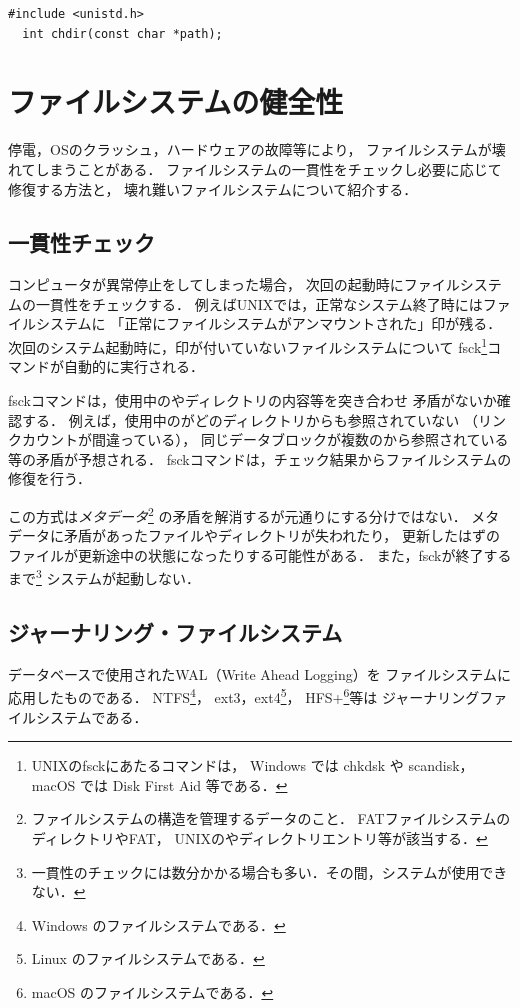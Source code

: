 \begin{lstlisting}[numbers=none]
  #include <unistd.h>
  int chdir(const char *path);
\end{lstlisting}

\section{ファイルシステムの健全性}
停電，OSのクラッシュ，ハードウェアの故障等により，
ファイルシステムが壊れてしまうことがある．
ファイルシステムの一貫性をチェックし必要に応じて修復する方法と，
壊れ難いファイルシステムについて紹介する．

\subsection{一貫性チェック}
\label{unmountFlag}
コンピュータが異常停止をしてしまった場合，
次回の起動時にファイルシステムの一貫性をチェックする．
例えばUNIXでは，正常なシステム終了時にはファイルシステムに
「正常にファイルシステムがアンマウントされた」印が残る．
次回のシステム起動時に，印が付いていないファイルシステムについて
fsck\footnote{
  UNIXのfsckにあたるコマンドは，
  Windows では chkdsk や scandisk，macOS では Disk First Aid 等である．
}コマンドが自動的に実行される．

fsckコマンドは，使用中の\inode やディレクトリの内容等を突き合わせ
矛盾がないか確認する．
例えば，使用中の\inode がどのディレクトリからも参照されていない
（リンクカウントが間違っている），
同じデータブロックが複数の\inode から参照されている等の矛盾が予想される．
fsckコマンドは，チェック結果からファイルシステムの修復を行う．

この方式は\emph{メタデータ}\footnote{
  ファイルシステムの構造を管理するデータのこと．
  FATファイルシステムのディレクトリやFAT，
  UNIXの\inode やディレクトリエントリ等が該当する．}
の矛盾を解消するが元通りにする分けではない．
メタデータに矛盾があったファイルやディレクトリが失われたり，
更新したはずのファイルが更新途中の状態になったりする可能性がある．
また，fsckが終了するまで\footnote{
  一貫性のチェックには数分かかる場合も多い．その間，システムが使用できない．}
システムが起動しない．

\subsection{ジャーナリング・ファイルシステム}
データベースで使用されたWAL（Write Ahead Logging）を
ファイルシステムに応用したものである．
NTFS\footnote{Windows のファイルシステムである．}，
ext3，ext4\footnote{Linux のファイルシステムである．}，
HFS+\footnote{macOS のファイルシステムである．}等は
ジャーナリングファイルシステムである．

